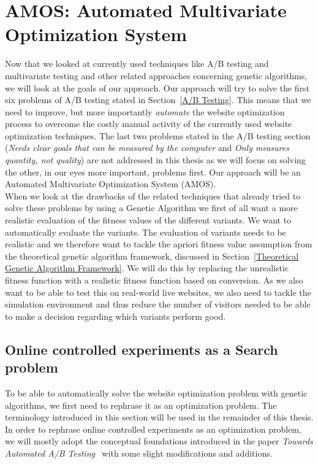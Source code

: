 \documentclass{report}
\begin{document}
\chapter{AMOS: Automated Multivariate Optimization System}
Now that we looked at currently used techniques like A/B testing and multivariate testing and other related approaches concerning genetic algorithms, we will look at the goals of our approach. Our approach will try to solve the first six problems of A/B testing stated in Section~\ref{A/B Testing}. This means that we need to improve, but more importantly \textit{automate} the website optimization process to overcome the costly manual activity of the currently used website optimization techniques. The last two problems stated in the A/B testing section (\textit{Needs clear goals that can be measured by the computer} and \textit{Only measures quantity, not quality}) are not addressed in this thesis as we will focus on solving the other, in our eyes more important, problems first. Our approach will be an Automated Multivariate Optimization System (AMOS).\\

When we look at the drawbacks of the related techniques that already tried to solve these problems by using a Genetic Algorithm we first of all want a more realistic evaluation of the fitness values of the different variants. We want to automatically evaluate the variants. The evaluation of variants needs to be realistic and we therefore want to tackle the apriori fitness value assumption from the theoretical genetic algorithm framework, discussed in Section~\ref{Theoretical Genetic Algorithm Framework}. We will do this by replacing the unrealistic fitness function with a realistic fitness function based on conversion. As we also want to be able to test this on real-world live websites, we also need to tackle the simulation environment and thus reduce the number of visitors needed to be able to make a decision regarding which variants perform good.

\section{Online controlled experiments as a Search problem}
To be able to automatically solve the website optimization problem with genetic algorithms, we first need to rephrase it as an optimization problem. The terminology introduced in this section will be used in the remainder of this thesis. In order to rephrase online controlled experiments as an optimization problem, we will mostly adopt the conceptual foundations introduced in the paper \emph{Towards Automated A/B Testing}~\cite{tamburrelli2014towards} with some slight modifications and additions.\\
\end{document}
